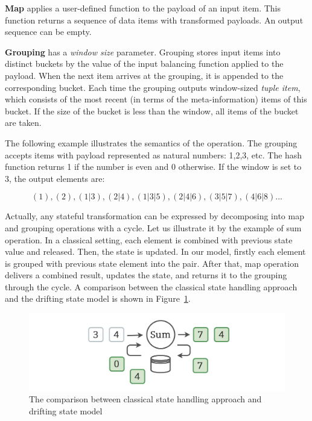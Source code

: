 {\bf Map} applies a user-defined function to the payload of an input item. This function returns a sequence of data items with transformed payloads. An output sequence can be empty.

{\bf Grouping} has a {\it window size} parameter. Grouping stores input items into distinct buckets by the value of the input balancing function applied to the payload. When the next item arrives at the grouping, it is appended to the corresponding bucket. Each time the grouping outputs window-sized {\it tuple item}, which consists of the most recent (in terms of the meta-information) items of this bucket. If the size of the bucket is less than the window, all items of the bucket are taken.

The following example illustrates the semantics of the operation. The grouping accepts items with payload represented as natural numbers: 1,2,3, etc. The hash function returns 1 if the number is even and 0 otherwise. If the window is set to 3, the output elements are:

\[(1), (2), (1|3), (2|4), (1|3|5), (2|4|6), (3|5|7), (4|6|8)...\]

Actually, any stateful transformation can be expressed by decomposing into map and grouping operations with a cycle. Let us illustrate it by the example of sum operation. In a classical setting, each element is combined with previous state value and released. Then, the state is updated. In our model, firstly each element is grouped with previous state element into the pair. After that, map operation delivers a combined result, updates the state, and returns it to the grouping through the cycle. A comparison between the classical state handling approach and the drifting state model is shown in Figure~\ref{classical-drifting}.

\begin{figure}[htbp]
  \centering
  \includegraphics[width=.49\textwidth]{pics/classical-drifting}
  \caption{The comparison between classical state handling approach and drifting state model}
  \label {classical-drifting}
\end{figure}

